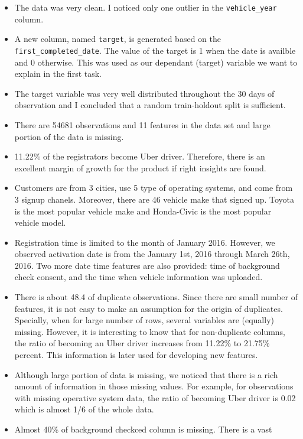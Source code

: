 \documentclass[11pt]{article}
\providecommand{\tightlist}{%
      \setlength{\itemsep}{0pt}\setlength{\parskip}{0pt}}
\begin{document}
\begin{itemize}
\tightlist
\item
  The data was very clean. I noticed only one outlier in the
  \texttt{vehicle\_year} column.
\item
  A new column, named \texttt{target}, is generated based on the
  \texttt{first\_completed\_date}. The value of the target is 1 when the
  date is availble and 0 otherwise. This was used as our dependant
  (target) variable we want to explain in the first task.
\item
  The target variable was very well distributed throughout the 30 days
  of observation and I concluded that a random train-holdout split is
  sufficient.
\item
  There are 54681 observations and 11 features in the data set and large
  portion of the data is missing.
\item
  11.22\% of the registrators become Uber driver. Therefore, there is an
  excellent margin of growth for the product if right insights are
  found.
\item
  Customers are from 3 cities, use 5 type of operating systems, and come
  from 3 signup chanels. Moreover, there are 46 vehicle make that signed
  up. Toyota is the most popular vehicle make and Honda-Civic is the
  most popular vehicle model.
\item
  Registration time is limited to the month of January 2016. However, we
  observed activation date is from the January 1st, 2016 through March
  26th, 2016. Two more date time features are also provided: time of
  background check consent, and the time when vehicle information was
  uploaded.
\item
  There is about 48.4 of duplicate observations. Since there are small
  number of features, it is not easy to make an assumption for the
  origin of duplicates. Specially, when for large number of rows,
  several variables are (equally) missing. However, it is interesting to
  know that for non-duplicate columns, the ratio of becoming an Uber
  driver increases from 11.22\% to 21.75\% percent. This information is
  later used for developing new features.
\item
  Although large portion of data is missing, we noticed that there is a
  rich amount of information in those missing values. For example, for
  observations with missing operative system data, the ratio of becoming
  Uber driver is 0.02 which is almost 1/6 of the whole data.
\item
  Almost 40\% of background checkced column is missing. There is a vast

\end{itemize}
\end{document}
